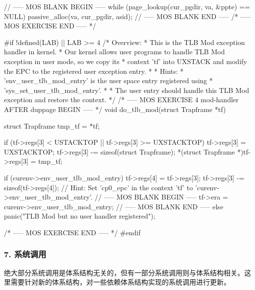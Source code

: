 \begin{CodeBlock}[language=BookC]
{    // ----- MOS BLANK BEGIN -----
    while (page_lookup(cur_pgdir, va, &ppte) == NULL) {
        passive_alloc(va, cur_pgdir, asid);
    }
    // ----- MOS BLANK END -----
}
/* ----- MOS EXERCISE END ----- */

#if !defined(LAB) || LAB >= 4
/* Overview:
 *   This is the TLB Mod exception handler in kernel.
 *   Our kernel allows user programs to handle TLB Mod exception in user mode, so we copy its
 *   context 'tf' into UXSTACK and modify the EPC to the registered user exception entry.
 *
 * Hints:
 *   'env_user_tlb_mod_entry' is the user space entry registered using
 *   'sys_set_user_tlb_mod_entry'.
 *
 *   The user entry should handle this TLB Mod exception and restore the context.
 */
/* ----- MOS EXERCISE 4 mod-handler AFTER duppage BEGIN ----- */
void do_tlb_mod(struct Trapframe *tf) {
    struct Trapframe tmp_tf = *tf;

    if (tf->regs[3] < USTACKTOP || tf->regs[3] >= UXSTACKTOP) {
        tf->regs[3] = UXSTACKTOP;
    }
    tf->regs[3] -= sizeof(struct Trapframe);
    *(struct Trapframe *)tf->regs[3] = tmp_tf;

    if (curenv->env_user_tlb_mod_entry) {
        tf->regs[4] = tf->regs[3];
        tf->regs[3] -= sizeof(tf->regs[4]);
        // Hint: Set 'cp0_epc' in the context 'tf' to 'curenv->env_user_tlb_mod_entry'.
        // ----- MOS BLANK BEGIN -----
        tf->era = curenv->env_user_tlb_mod_entry;
        // ----- MOS BLANK END -----
    } else {
        panic("TLB Mod but no user handler registered");
    }
}
/* ----- MOS EXERCISE END ----- */
#endif

\end{CodeBlock}

\subsubsection{7. 系统调用}\label{sec:13-operating-system-009}

绝大部分系统调用是体系结构无关的，但有一部分系统调用则与体系结构相关。这里需要针对新的体系结构，对一些依赖体系结构实现的系统调用进行更新。

